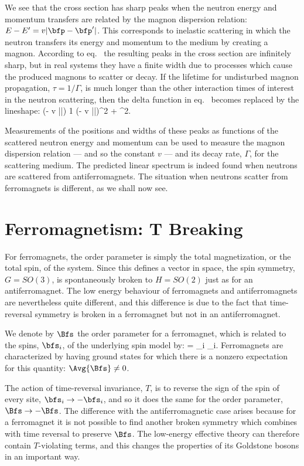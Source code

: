 \documentclass[12pt]{report}
\begin{document}
We see that the cross section has sharp peaks when the
neutron energy and momentum transfers are related by the
magnon dispersion relation: $E - E' = v|\bfp - \bfp'|$.
This corresponds to inelastic scattering in which the
neutron transfers its energy and momentum to the medium by
creating a magnon. According to
eq.~ the resulting peaks in the
cross section are infinitely sharp, but in real systems
they have a finite width due to processes which cause the
produced magnons to scatter or decay. If the lifetime for
undisturbed magnon propagation, $\tau = 1/\Gamma$, is much
longer than the other interaction times of interest in the
neutron scattering, then the delta function in
eq.~ becomes replaced by the
lineshape:
%
\eq
\label{resultwithwidthincluded}
\delta(\omega - v |\bfq|) \to { \Gamma \over 2 \pi} 
\; {1 \over (\omega - v
|\bfq|)^2 +  \; \Gamma^2}.
\eeq

Measurements of the positions and widths of these peaks as
functions of the scattered neutron energy and momentum can
be used to measure the magnon dispersion relation --- and
so the constant $v$ --- and its decay rate, $\Gamma$, for
the scattering medium. The predicted linear spectrum is
indeed found when neutrons are scattered from
antiferromagnets. The situation when neutrons scatter from
ferromagnets is different, as we shall now see.

\section{Ferromagnetism: T Breaking}

For ferromagnets, the order parameter is simply the total
magnetization, or the total spin, of the system. Since this
defines a vector in space, the spin symmetry, $G = SO(3)$,
is spontaneously broken to $H = SO(2)$ just as for an
antiferromagnet. The low energy behaviour of ferromagnets
and antiferromagnets are nevertheless quite different, and
this difference is due to the fact that time-reversal
symmetry is broken in a ferromagnet but not in an
antiferromagnet.

We denote by $\Bfs$ the order parameter for a ferromagnet,
which is related to the spins, $\bfs_i$, of the underlying
spin model by:  
%
\eq
\label{forderparam}
\Bfs = \sum_i \bfs_i.
\eeq
%
Ferromagnets are characterized by having ground states for
which there is a nonzero expectation for this quantity:
$\Avg{ \Bfs} \neq 0$.

The action of time-reversal invariance, $T$, is to reverse
the sign of the spin of every site, $\bfs_i \to - \bfs_i$,
and so it does the same for the order parameter, $\Bfs \to
- \Bfs$. The difference with the antiferromagnetic case
arises because for a ferromagnet it is not possible to find
another broken symmetry which combines with time reversal to
preserve $\Bfs$. The low-energy effective theory can
therefore contain $T$-violating terms, and this changes the
properties of its Goldstone bosons in an important way.
\end{document}
